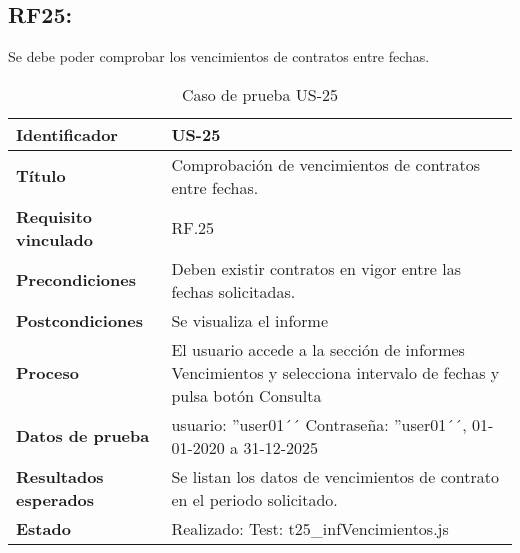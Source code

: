 \subsection{RF25:} Se debe poder comprobar los vencimientos de contratos entre fechas.
\begin{table}[H]
	\centering
	\renewcommand{\arraystretch}{1.3} 
	\begin{tabularx}{\textwidth}{|l|X|}
		\hline
		\textbf{Identificador} & US-25 \\
		\hline
		\textbf{Título} &Comprobación de vencimientos de contratos entre fechas.	\\
		\hline
		\textbf{Requisito vinculado} & RF.25 \\
		\hline
		\textbf{Precondiciones} & Deben existir contratos en vigor entre las fechas solicitadas.\\
		\hline
		\textbf{Postcondiciones} & Se visualiza el informe \\
		\hline
		\textbf{Proceso} & El usuario accede a la sección de informes Vencimientos y selecciona intervalo de fechas y pulsa botón Consulta
		\\
		\hline
		\textbf{Datos de prueba} & usuario: ''user01´´ Contraseña: ''user01´´, 01-01-2020 a 31-12-2025 \\
		\hline
		\textbf{Resultados esperados} & Se listan los datos de vencimientos de contrato en el periodo solicitado. \\
		\hline
		\textbf{Estado} & Realizado: Test: t25\_infVencimientos.js \\
		\hline
	\end{tabularx}
	\caption{Caso de prueba US-25}
	\label{tab:caso_uso25}
\end{table}

